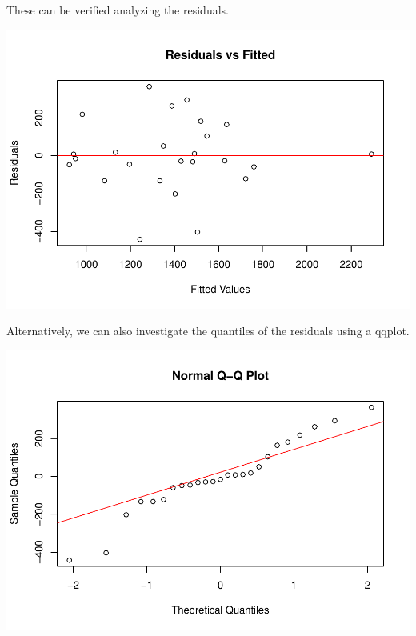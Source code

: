 \documentclass[
]{article}
\newenvironment{Shaded}{\begin{snugshade}}{\end{snugshade}}
\newcommand{\AttributeTok}[1]{\textcolor[rgb]{0.13,0.29,0.53}{#1}}
\newcommand{\DecValTok}[1]{\textcolor[rgb]{0.00,0.00,0.81}{#1}}
\newcommand{\FunctionTok}[1]{\textcolor[rgb]{0.13,0.29,0.53}{\textbf{#1}}}
\newcommand{\NormalTok}[1]{#1}
\newcommand{\SpecialCharTok}[1]{\textcolor[rgb]{0.81,0.36,0.00}{\textbf{#1}}}
\newcommand{\StringTok}[1]{\textcolor[rgb]{0.31,0.60,0.02}{#1}}
\begin{document}
These can be verified analyzing the residuals.

\begin{Shaded}
\end{Shaded}

\includegraphics{Tests_and_Applications_files/figure-latex/unnamed-chunk-42-1.pdf}

Alternatively, we can also investigate the quantiles of the residuals
using a qqplot.

\begin{Shaded}
\end{Shaded}

\includegraphics{Tests_and_Applications_files/figure-latex/unnamed-chunk-43-1.pdf}
\end{document}
